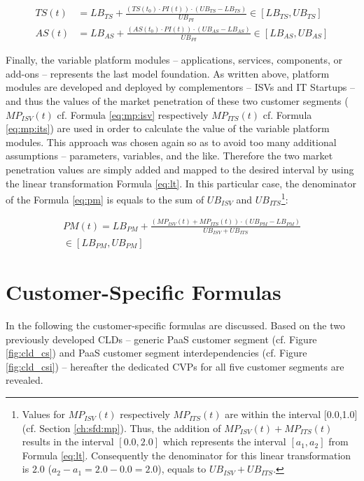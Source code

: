 \begin{align}
	TS(t) &= LB_{TS} +  \frac{(TS(t_0) \cdot PI(t)) \cdot (UB_{TS} - LB_{TS})}{UB_{PI}} \in [LB_{TS},UB_{TS}]\label{eq:ts}\\
	AS(t) &= LB_{AS} +  \frac{(AS(t_0) \cdot PI(t)) \cdot (UB_{AS} - LB_{AS})}{UB_{PI}} \in [LB_{AS},UB_{AS}]\label{eq:as}
\end{align} 

Finally, the variable platform modules -- applications, services, components, or add-ons -- represents the last model foundation. As written above, platform modules are developed and deployed by complementors -- \acp{ISV} and \ac{IT} Startups -- and thus the values of the market penetration of these two customer segments ($MP_{ISV}(t)$ cf. Formula \ref{eq:mp:isv} respectively $MP_{ITS}(t)$ cf. Formula \ref{eq:mp:its}) are used in order to calculate the value of the variable platform modules. This approach was chosen again so as to avoid too many additional assumptions -- parameters, variables, and the like. Therefore the two market penetration values are simply added and mapped to the desired interval by using the linear transformation Formula \ref{eq:lt}. In this particular case, the denominator of the Formula \ref{eq:pm} is equals to the sum of $UB_{ISV}$ and $UB_{ITS}$\footnote{Values for $MP_{ISV}(t)$ respectively $MP_{ITS}(t)$ are within the interval [0.0,1.0] (cf. Section \ref{ch:sfd:mp}). Thus, the addition of $MP_{ISV}(t) + MP_{ITS}(t)$ results in the interval $[0.0,2.0]$ which represents the interval $[a_1,a_2]$ from Formula \ref{eq:lt}. Consequently the denominator for this linear transformation is $2.0$ ($a_2 - a_1 = 2.0 - 0.0 = 2.0$), equals to $UB_{ISV} + UB_{ITS}$.}:

\begin{eqnarray}\label{eq:pm}
	PM(t) = LB_{PM} + \frac{(MP_{ISV}(t) + MP_{ITS}(t)) \cdot (UB_{PM} - LB_{PM})}{UB_{ISV} + UB_{ITS}} \nonumber \\ \in [LB_{PM},UB_{PM}]
\end{eqnarray}

\section{Customer-Specific Formulas}\label{ch:sfd:csf}

In the following the customer-specific formulas are discussed. Based on the two previously developed \acp{CLD} -- generic \ac{PaaS} customer segment (cf. Figure \ref{fig:cld_cs}) and \ac{PaaS} customer segment interdependencies (cf. Figure \ref{fig:cld_csi}) -- hereafter the dedicated \acp{CVP} for all five customer segments are revealed.

